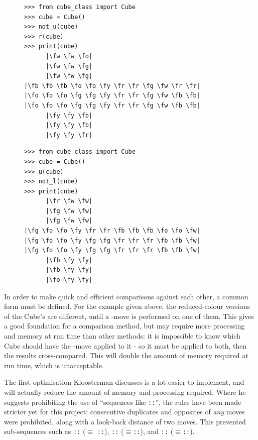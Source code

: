 \documentclass{report}
\newcommand{\tit}[1]{\textit{#1}}
\newcommand{\movesequence}[1]{\uppercase{\texttt{:\formatmoves{#1}:}}}
\newcommand{\move}[1]{\uppercase{\texttt{\formatmovesnospace{#1}}}-move}
\newcommand{\fw}{\color{gray}W }
\newcommand{\fo}{\color{orange}O }
\newcommand{\fg}{\color{green}G }
\newcommand{\fr}{\color{red}R }
\newcommand{\fb}{\color{blue}B }
\newcommand{\fy}{\color{yellow}Y }
\begin{document}
	
	\begin{figure}[H]
		\centering
		\begin{minipage}{0.4\textwidth}
			\begin{lstlisting}[caption={Performing sequence $A$}, label={lst:reflection1}]
>>> from cube_class import Cube
>>> cube = Cube()
>>> not_u(cube)
>>> r(cube)
>>> print(cube)
      |\fw \fw \fo|
      |\fw \fw \fg|
      |\fw \fw \fg|
|\fb \fb \fb \fo \fo \fy \fr \fr \fg \fw \fr \fr|
|\fo \fo \fo \fg \fg \fy \fr \fr \fg \fw \fb \fb|
|\fo \fo \fo \fg \fg \fy \fr \fr \fg \fw \fb \fb|
      |\fy \fy \fb|
      |\fy \fy \fb|
      |\fy \fy \fr|\end{lstlisting}
		\end{minipage}%
		\hspace{10mm}
		\begin{minipage}{0.4\textwidth}
			\begin{lstlisting}[caption={Perform $A$'s reflection, $A'$}, label={lst:reflection2}]
>>> from cube_class import Cube
>>> cube = Cube()
>>> u(cube)
>>> not_l(cube)
>>> print(cube)
      |\fr \fw \fw|
      |\fg \fw \fw|
      |\fg \fw \fw|
|\fg \fo \fo \fy \fr \fr \fb \fb \fb \fo \fo \fw|
|\fg \fo \fo \fy \fg \fg \fr \fr \fr \fb \fb \fw|
|\fg \fo \fo \fy \fg \fg \fr \fr \fr \fb \fb \fw|
      |\fb \fy \fy|
      |\fb \fy \fy|
      |\fo \fy \fy|\end{lstlisting}\end{minipage}\end{figure}
	In order to make quick and efficient comparisons against each other, a common form must be defined. For the example given above, the reduced-colour versions of the Cube's are different, until a \move{y2} is performed on one of them. This gives a good foundation for a comparison method, but may require more processing and memory at run time than other methods: it is impossible to know which Cube should have the \move{y2} applied to it - so it must be applied to both, then the results cross-compared. This will double the amount of memory required at run time, which is unacceptable.
	
	The first optimisation Kloosterman discusses is a lot easier to implement, and will actually reduce the amount of memory and processing required. Where he suggests prohibiting the use of \enquote{sequences like \movesequence{r2l2r"}}, the rules have been made stricter yet for this project: consecutive duplicates and opposites of \tit{any} moves were prohibited, along with a look-back distance of two moves. This prevented sub-sequences such as \movesequence{l.l} ($\equiv$ \movesequence{l"}), \movesequence{l'l} ($\equiv$\movesequence{$\phi$}), and \movesequence{l'r.l} ($\equiv$\movesequence{r}).
	
\end{document}
